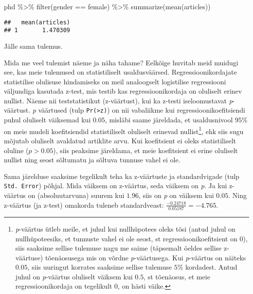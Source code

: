\documentclass[
]{book}
\newenvironment{Shaded}{\begin{snugshade}}{\end{snugshade}}
\newcommand{\FunctionTok}[1]{\textcolor[rgb]{0.00,0.00,0.00}{#1}}
\newcommand{\NormalTok}[1]{#1}
\newcommand{\SpecialCharTok}[1]{\textcolor[rgb]{0.00,0.00,0.00}{#1}}
\newcommand{\StringTok}[1]{\textcolor[rgb]{0.31,0.60,0.02}{#1}}
\begin{document}
\begin{Shaded}
\begin{Highlighting}[]
\NormalTok{phd }\SpecialCharTok{\%\textgreater{}\%} 
  \FunctionTok{filter}\NormalTok{(gender }\SpecialCharTok{==} \StringTok{\textquotesingle{}female\textquotesingle{}}\NormalTok{) }\SpecialCharTok{\%\textgreater{}\%} 
  \FunctionTok{summarize}\NormalTok{(}\FunctionTok{mean}\NormalTok{(articles))}
\end{Highlighting}
\end{Shaded}

\begin{verbatim}
##   mean(articles)
## 1       1.470309
\end{verbatim}

Jälle sama tulemus.

Mida me veel tulemist näeme ja näha tahame? Eelkõige huvitab meid muidugi see, kas meie tulemused on statistiliselt usaldusväärsed. Regressioonikordajate statistilise olulisuse hindamiseks on meil analoogselt logistilise regressiooni väljundiga kasutada z-test, mis testib kas regressioonikordaja on oluliselt erinev nullist. Näeme nii teststatistikut (z-väärtust), kui ka z-testi iseloomustavat \emph{p}-väärtust. \emph{p} väärtused (tulp \texttt{Pr(\textgreater{}\textbar{}z\textbar{})}) on nii vabaliikme kui regressioonikoefitsiendi puhul oluliselt väiksemad kui \(0.05\), misläbi saame järeldada, et usaldusnivool \(95\%\) on meie mudeli koefitsiendid statistiliselt oluliselt erinevad nullist\footnote{\emph{p}-väärtus ütleb meile, et juhul kui nullhüpotees oleks tõsi (antud juhul on nullhüpoteesiks, et tunnuste vahel ei ole seost, st regressioonikoefitsient on \(0\)), siis saaksime sellise tulemuse nagu me saime (täpsemalt öeldes sellise z-väärtuse) tõenäosusega mis on võrdne \emph{p}-väärtusega. Kui \emph{p}-väärtus on näiteks \(0.05\), siis uuringut korrates saaksime sellise tulemuse \(5\%\) kordadest. Antud juhul on \emph{p}-väärtus oluliselt väiksem kui \(0.5\), st tõenäosus, et meie regressioonikordaja on tegelikult \(0\), on hästi väike.}, ehk siis sugu mõjutab oluliselt avaldatud artiklite arvu. Kui koefitsient ei oleks statistiliselt oluline (\(p > 0.05\)), siis peaksime järeldama, et meie koefitsient ei erine oluliselt nullist ning seost sõltumatu ja sõltuva tunnuse vahel ei ole.

Sama järelduse saaksime tegelikult teha ka z-väärtuste ja standardvigade (tulp \texttt{Std.\ Error}) põhjal. Mida väiksem on z-väärtus, seda väiksem on \emph{p}. Ja kui z-väärtus on (absoluutarvuna) suurem kui \(1.96\), siis on \emph{p} on väiksem kui \(0.05\). Ning z-väärtus (ja z-test) omakorda tuleneb standardveast: \(\frac{-0.24718}{0.05187} = -4.765\).
\end{document}
